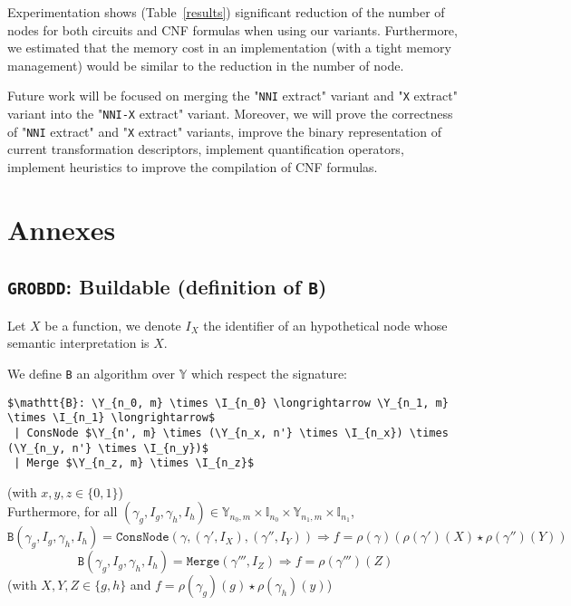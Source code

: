 \documentclass[a4paper,10pt]{article}
\newcommand{\Y}{\mathbb{Y}}
\newcommand{\I}{\mathbb{I}}
\newcommand{\nniextract}{"\texttt{NNI} extract"}
\newcommand{\xextract}{"\texttt{X} extract"}
\newcommand{\GroBdd}{\texttt{GROBDD}}
\begin{document}
Experimentation shows (Table~\ref{results}) significant reduction of the number of nodes for both circuits \cite{BenchSatlib, BenchLgsynth91} and CNF formulas \cite{BenchIscas99} when using our variants.
Furthermore, we estimated that the memory cost in an implementation (with a tight memory management) would be similar to the reduction in the number of node.

Future work will be focused on merging the \nniextract{} variant and \xextract{} variant into the "\texttt{NNI-X} extract" variant.
Moreover, we will prove the correctness of \nniextract{} and \xextract{} variants, improve the binary representation of current transformation descriptors, implement quantification operators, implement heuristics to improve the compilation of CNF formulas.


\newpage
{}


\newpage
\tableofcontents

\newpage

\section{Annexes}

\subsection{\GroBdd{}: Buildable (definition of \texttt{B})\label{grobdd-B-constraints}}

Let $X$ be a function, we denote $I_X$ the identifier of an hypothetical node whose semantic interpretation is $X$.

We define \texttt{B} an algorithm over $\Y$ which respect the signature: 
\begin{lstlisting}
$\mathtt{B}: \Y_{n_0, m} \times \I_{n_0} \longrightarrow \Y_{n_1, m} \times \I_{n_1} \longrightarrow$
 | ConsNode $\Y_{n', m} \times (\Y_{n_x, n'} \times \I_{n_x}) \times (\Y_{n_y, n'} \times \I_{n_y})$
 | Merge $\Y_{n_z, m} \times \I_{n_z}$
\end{lstlisting}
(with $x, y, z \in \{0, 1\}$) \\
Furthermore, for all $(\gamma_g, I_g, \gamma_h, I_h) \in \Y_{n_0, m} \times \I_{n_0} \times \Y_{n_1, m} \times \I_{n_1}$, 
\[ \texttt{B}(\gamma_g, I_g, \gamma_h, I_h) = \texttt{ConsNode} (\gamma, (\gamma', I_X), (\gamma'', I_Y)) \Rightarrow f = \rho\left(\gamma\right) \left(\rho\left(\gamma'\right)(X) \star \rho\left(\gamma''\right)(Y)\right)\]
\[ \texttt{B}(\gamma_g, I_g, \gamma_h, I_h) = \texttt{Merge} (\gamma''', I_Z) \Rightarrow f = \rho(\gamma''')(Z) \]
(with $X, Y, Z \in\{g, h\}$ and $f = \rho(\gamma_g)(g) \star \rho(\gamma_h)(y)$)
\end{document}
